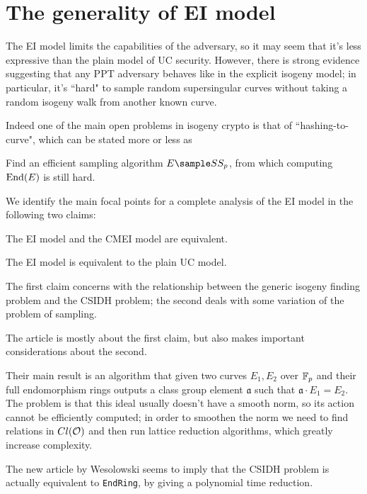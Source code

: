 \section{The generality of EI model}

The EI model limits the capabilities of the adversary, so it may seem that it's less expressive than the plain model of UC security. However, there is strong evidence suggesting that any PPT adversary behaves like in the explicit isogeny model; in particular, it's ``hard" to sample random supersingular curves without taking a random isogeny walk from another known curve.

Indeed one of the main open problems in isogeny crypto is that of ``hashing-to-curve", which can be stated more or less as
\begin{problem}
    Find an efficient sampling algorithm $E\sample SS_p$, from which computing $\operatorname{End}(E)$ is still hard.
\end{problem}

We identify the main focal points for a complete analysis of the EI model in the following two claims:

\begin{claim}\label{claim_CMEI}
    The EI model and the CMEI model are equivalent.
\end{claim}

\begin{claim}\label{claim_EIUC}
    The EI model is equivalent to the plain UC model.
\end{claim}

The first claim concerns with the relationship between the generic isogeny finding problem and the CSIDH problem; the second deals with some variation of the problem of sampling.

The article \cite{CSIDH_EndRing} is mostly about the first claim, but also makes important considerations about the second.

Their main result is an algorithm that given two curves $E_1,E_2$ over $\mathbb{F}_p$ and their full endomorphism rings outputs a class group element $\mathfrak{a}$ such that $\mathfrak{a}\cdot E_1=E_2$. The problem is that this ideal usually doesn't have a smooth norm, so its action cannot be efficiently computed; in order to smoothen the norm we need to find relations in $Cl(\mathcal{O})$ and then run lattice reduction algorithms, which greatly increase complexity.

The new article by Wesolowski \cite{Weso_CSIDH} seems to imply that the CSIDH problem is actually equivalent to \texttt{EndRing}, by giving a polynomial time reduction.

